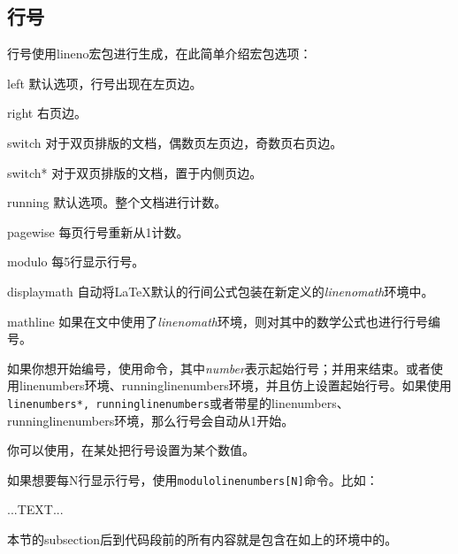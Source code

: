 \subsection{行号}
\begin{linenumbers}
\modulolinenumbers[3]
行号使用lineno宏包进行生成，在此简单介绍宏包选项：
\begin{para}
  \item[left]默认选项，行号出现在左页边。
  \item[right]右页边。
  \item[switch]对于双页排版的文档，偶数页左页边，奇数页右页边。
  \item[switch*]对于双页排版的文档，置于内侧页边。
  \item[running]默认选项。整个文档进行计数。
  \item[pagewise]每页行号重新从1计数。
  \item[modulo]每5行显示行号。
  \item[displaymath]自动将\LaTeX 默认的行间公式包装在新定义的\textit{linenomath}环境中。
  \item[mathline]如果在文中使用了\textit{linenomath}环境，则对其中的数学公式也进行行号编号。
\end{para}

如果你想开始编号，使用\latexline{\\linenumbers[number]}命令，其中\textit{number}表示起始行号；并用\latexline{\\nolinenumbers}来结束。或者使用linenumbers环境、runninglinenumbers环境，并且仿上设置起始行号。如果使用\texttt{ linenumbers*, runninglinenumbers}或者带星的linenumbers、runninglinenumbers环境，那么行号会自动从1开始。

你可以使用\latexline{\\resetlinenumber[number]}，在某处把行号设置为某个数值。

如果想要每N行显示行号，使用\texttt{modulolinenumbers[N]}命令。比如：
\end{linenumbers}

\begin{latex}{}
\begin{linenumbers}
  \modulolinenumbers[3]
  ...TEXT...
\end{linenumbers}
\end{latex}

本节的subsection后到代码段前的所有内容就是包含在如上的环境中的。


%

